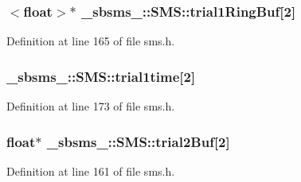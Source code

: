 \subsubsection[{\texorpdfstring{trial1\+Ring\+Buf}{trial1RingBuf}}]{$<$float$>$$\ast$ \+\_\+sbsms\+\_\+\+::\+S\+M\+S\+::trial1\+Ring\+Buf\mbox{[}2\mbox{]}\hspace{0.3cm}{\ttfamily [protected]}}\hypertarget{class__sbsms___1_1_s_m_s_a54d9cf11bc15ac0f5e60841941962ef8}{}\label{class__sbsms___1_1_s_m_s_a54d9cf11bc15ac0f5e60841941962ef8}


Definition at line 165 of file sms.\+h.

\subsubsection[{\texorpdfstring{trial1time}{trial1time}}]{ \+\_\+sbsms\+\_\+\+::\+S\+M\+S\+::trial1time\mbox{[}2\mbox{]}\hspace{0.3cm}{\ttfamily [protected]}}\hypertarget{class__sbsms___1_1_s_m_s_acf420b2b5004dc7305c4843644a020ae}{}\label{class__sbsms___1_1_s_m_s_acf420b2b5004dc7305c4843644a020ae}


Definition at line 173 of file sms.\+h.

\subsubsection[{\texorpdfstring{trial2\+Buf}{trial2Buf}}]{\setlength{\rightskip}{0pt plus 5cm}float$\ast$ \+\_\+sbsms\+\_\+\+::\+S\+M\+S\+::trial2\+Buf\mbox{[}2\mbox{]}\hspace{0.3cm}{\ttfamily [protected]}}\hypertarget{class__sbsms___1_1_s_m_s_ac81c4d6e4e662c0e8eeaea6e64b26899}{}\label{class__sbsms___1_1_s_m_s_ac81c4d6e4e662c0e8eeaea6e64b26899}


Definition at line 161 of file sms.\+h.


